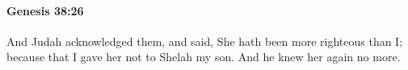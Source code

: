 
		\paragraph{Genesis 38:26} %
			\label{GENESIS-38-26}

			And Judah acknowledged them, and said, She hath been more righteous than I; because that I gave her not to Shelah my son. And he knew her again no more.


